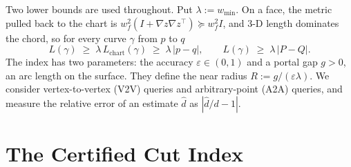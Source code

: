 \documentclass[sigconf,nonacm,screen]{acmart}
\newcommand{\eps}{\varepsilon}
\begin{document}
Two lower bounds are used throughout. Put $\lambda := w_{\min}$. On a face, the metric pulled back to the
chart is $w_f^2(I + \nabla z\nabla z^\top) \succeq w_f^2 I$, and 3-D length dominates the chord, so for every
curve $\gamma$ from $p$ to $q$
\begin{equation}
L(\gamma) \;\ge\; \lambda\, L_{\mathrm{chart}}(\gamma) \;\ge\; \lambda\,|p-q|,
\qquad L(\gamma) \;\ge\; \lambda\,|P-Q|.
\label{eq:lower}
\end{equation}
The index has two parameters: the accuracy $\eps\in(0,1)$ and a portal gap $g>0$, an arc length on the
surface. They define the near radius $R := g/(\eps\lambda)$. We consider vertex-to-vertex (V2V) queries and
arbitrary-point (A2A) queries, and measure the relative error of an estimate $\hat d$ as $|\hat d/d - 1|$.

\section{The Certified Cut Index}
\label{sec:index}
\end{document}
